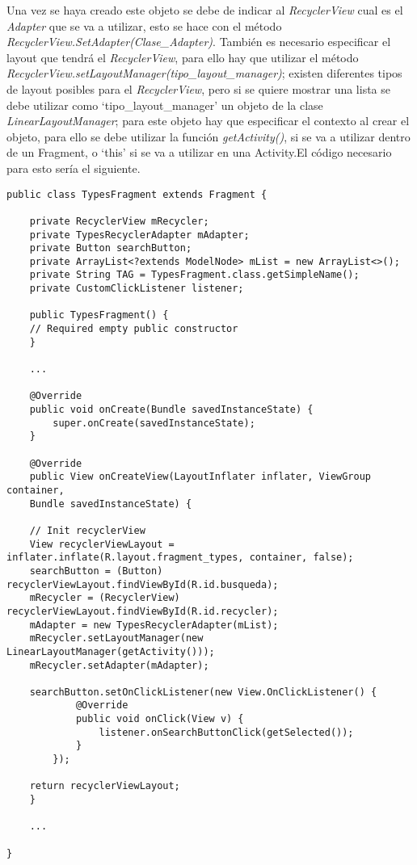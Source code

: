 Una vez se haya creado este objeto se debe de indicar al \textit{RecyclerView} cual es el \textit{Adapter} que se va a utilizar, esto se hace con el método \textit{RecyclerView.SetAdapter(Clase\_Adapter)}. También es necesario especificar el layout que tendrá el \textit{RecyclerView}, para ello hay que utilizar el método \textit{RecyclerView.setLayoutManager(tipo\_layout\_manager)}; existen diferentes tipos de layout posibles para el \textit{RecyclerView}, pero si se quiere mostrar una lista se debe utilizar como \enquote*{tipo\_layout\_manager} un objeto de la clase \textit{LinearLayoutManager}; para este objeto hay que especificar el contexto al crear el objeto, para ello se debe utilizar la función \textit{getActivity()}, si se va a utilizar dentro de un Fragment, o \enquote*{this} si se va a utilizar en una Activity.El código necesario para esto sería el siguiente.

\begin{lstlisting}[caption=Código de una clase que contiene un RecyclerView.]
public class TypesFragment extends Fragment {

	private RecyclerView mRecycler;
	private TypesRecyclerAdapter mAdapter;
	private Button searchButton;
	private ArrayList<?extends ModelNode> mList = new ArrayList<>();
	private String TAG = TypesFragment.class.getSimpleName();
	private CustomClickListener listener;
	
	public TypesFragment() {
	// Required empty public constructor
	}
	
	...
	
	@Override
	public void onCreate(Bundle savedInstanceState) {
		super.onCreate(savedInstanceState);
	}
	
	@Override
	public View onCreateView(LayoutInflater inflater, ViewGroup container,
	Bundle savedInstanceState) {
	
	// Init recyclerView
	View recyclerViewLayout = inflater.inflate(R.layout.fragment_types, container, false);
	searchButton = (Button) recyclerViewLayout.findViewById(R.id.busqueda);
	mRecycler = (RecyclerView) recyclerViewLayout.findViewById(R.id.recycler);
	mAdapter = new TypesRecyclerAdapter(mList);
	mRecycler.setLayoutManager(new LinearLayoutManager(getActivity()));
	mRecycler.setAdapter(mAdapter);
	
	searchButton.setOnClickListener(new View.OnClickListener() {
			@Override
			public void onClick(View v) {
				listener.onSearchButtonClick(getSelected());
			}
		});
	
	return recyclerViewLayout;
	}
		
	...

}
\end{lstlisting}

